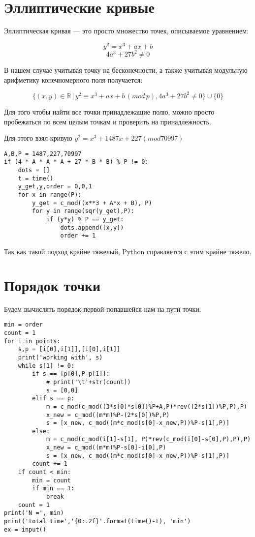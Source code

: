 \section{Эллиптические кривые}

Эллиптическая кривая — это просто множество точек, описываемое уравнением:

$$
y^2 = x^3 + ax + b
$$
$$
4a^3 + 27b^2 \neq 0
$$

В нашем случае учитывая точку на бесконечности, а также учитывая модульную арифметику конечномерного поля получается:

$$
\{(x,y) \in \mathds{R} \, | \,y^2 \equiv x^3 + ax + b \, (mod \, p), 4a^3 + 27b^2 \neq 0\} \cup \{0\}
$$

Для того чтобы найти все точки принадлежащие полю, можно просто пробежаться по всем целым точкам и проверить на принадлежность.

Для этого взял кривую $y^2 = x^3 + 1487x + 227 (mod 70997)$

\begin{lstlisting}
A,B,P = 1487,227,70997
if (4 * A * A * A + 27 * B * B) % P != 0:
    dots = []
    t = time()
    y_get,y,order = 0,0,1
    for x in range(P):
        y_get = c_mod((x**3 + A*x + B), P)
        for y in range(sqr(y_get),P):
            if (y*y) % P == y_get:
                dots.append([x,y])
                order += 1
\end{lstlisting}

Так как такой подход крайне тяжелый, Python справляется с этим крайне тяжело.

\section{Порядок точки}

Будем вычислять порядок первой попавшейся нам на пути точки.

\begin{lstlisting}
min = order
count = 1
for i in points:
    s,p = [i[0],i[1]],[i[0],i[1]]
    print('working with', s)
    while s[1] != 0:
        if s == [p[0],P-p[1]]:
            # print('\t'+str(count))
            s = [0,0]
        elif s == p:
            m = c_mod(c_mod((3*s[0]*s[0])%P+A,P)*rev((2*s[1])%P,P),P)
            x_new = c_mod((m*m)%P-(2*s[0])%P,P)
            s = [x_new, c_mod((m*c_mod(s[0]-x_new,P))%P-s[1],P)]
        else:
            m = c_mod(c_mod(i[1]-s[1], P)*rev(c_mod(i[0]-s[0],P),P),P)
            x_new = c_mod((m*m)%P-s[0]-i[0],P)
            s = [x_new, c_mod((m*c_mod(s[0]-x_new,P))%P-s[1],P)]
        count += 1
    if count < min:
        min = count
        if min == 1:
            break
    count = 1
print('N =', min)
print('total time','{0:.2f}'.format(time()-t), 'min')
ex = input()
\end{lstlisting}

